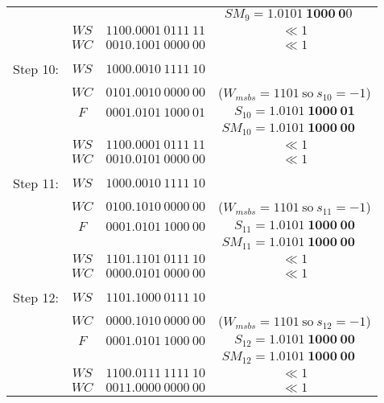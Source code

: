 \documentclass[12pt]{article}
\begin{document}
{\begin{center}
\begin{tabular}{cccc}
            &        &                     &$SM_9=\mathbf{1.0101\ 1000\ 0}0\phantom{M}$\\
    \cline{2-3}
            &$WS    $&$1100.0001\ 0111\ 11$&$\ll1$\\
            &$WC    $&$0010.1001\ 0000\ 00$&$\ll1$\\
    \hdashline\\
    Step 10:&$WS    $&$1000.0010\ 1111\ 10$&\\
            &$WC    $&$0101.0010\ 0000\ 00$&($W_{msbs}=1101\ \text{so}\ s_{10}=-1$)\\
            &$F     $&$0001.0101\ 1000\ 01$&$S_{10}=\mathbf{1.0101\ 1000\ 01}$\\
            &        &                     &$SM_{10}=\mathbf{1.0101\ 1000\ 00}\phantom{M}$\\
    \cline{2-3}
            &$WS    $&$1100.0001\ 0111\ 11$&$\ll1$\\
            &$WC    $&$0010.0101\ 0000\ 00$&$\ll1$\\
    \hdashline\\
    Step 11:&$WS    $&$1000.0010\ 1111\ 10$&\\
            &$WC    $&$0100.1010\ 0000\ 00$&($W_{msbs}=1101\ \text{so}\ s_{11}=-1$)\\
            &$F     $&$0001.0101\ 1000\ 00$&$S_{11}=\mathbf{1.0101\ 1000\ 00}$\\
            &        &                     &$SM_{11}=\mathbf{1.0101\ 1000\ 00}\phantom{M}$\\
    \cline{2-3}
            &$WS    $&$1101.1101\ 0111\ 10$&$\ll1$\\
            &$WC    $&$0000.0101\ 0000\ 00$&$\ll1$\\
    \hdashline\\
    Step 12:&$WS    $&$1101.1000\ 0111\ 10$&\\
            &$WC    $&$0000.1010\ 0000\ 00$&($W_{msbs}=1101\ \text{so}\ s_{12}=-1$)\\
            &$F     $&$0001.0101\ 1000\ 00$&$S_{12}=\mathbf{1.0101\ 1000\ 00}$\\
            &        &                     &$SM_{12}=\mathbf{1.0101\ 1000\ 00}\phantom{M}$\\
    \cline{2-3}
            &$WS    $&$1100.0111\ 1111\ 10$&$\ll1$\\
            &$WC    $&$0011.0000\ 0000\ 00$&$\ll1$\\
\end{tabular}
\end{center}
}
\end{document}
